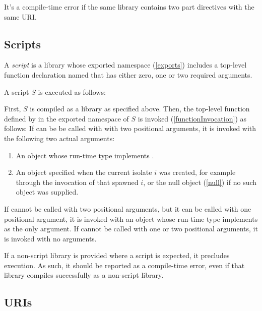 \documentclass{article}
\begin{document}
\LMHash{}
It's a compile-time error if the same library contains two part directives with the same URI.


\subsection{Scripts}

\LMHash{}
A {\em script} is a library whose exported namespace (\ref{exports}) includes
a top-level function declaration named 
that has either zero, one or two required arguments.

A script $S$ is executed as follows:

\LMHash{}
First, $S$ is compiled as a library as specified above.
Then, the top-level function defined by 
in the exported namespace of $S$ is invoked (\ref{functionInvocation})
as follows:
If  can be be called with with two positional arguments,
it is invoked with the following two actual arguments:
\begin{enumerate}
\item An object whose run-time type implements .
\item An object specified when the current isolate $i$ was created,
for example through the invocation of  that spawned $i$,
or the null object (\ref{null}) if no such object was supplied.
\end{enumerate}
If  cannot be called with two positional arguments,
but it can be called with one positional argument,
it is invoked with an object whose run-time type implements 
as the only argument.
If  cannot be called with one or two positional arguments,
it is invoked with no arguments.



\LMHash{}
If a non-script library is provided where a script is expected,
it precludes execution.
As such, it should be reported as a compile-time error,
even if that library compiles successfully as a non-script library.


\subsection{URIs}
\end{document}

